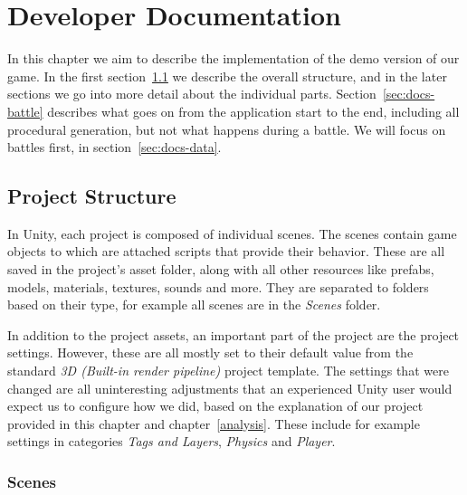 \chapter{Developer Documentation}

In this chapter we aim to describe the implementation of the demo version of our game.
In the first section~\ref{sec:docs-proj} we describe the overall structure, and in the later sections we go into more detail about the individual parts.
Section~\ref{sec:docs-battle} describes what goes on from the application start to the end, including all procedural generation, but not what happens during a battle.
We will focus on battles first, in section~\ref{sec:docs-data}.

\section{Project Structure}\label{sec:docs-proj}

In Unity, each project is composed of individual scenes.
The scenes contain game objects to which are attached scripts that provide their behavior.
These are all saved in the project's asset folder, along with all other resources like prefabs, models, materials, textures, sounds and more.
They are separated to folders based on their type, for example all scenes are in the \emph{Scenes} folder.

In addition to the project assets, an important part of the project are the project settings.
However, these are all mostly set to their default value from the standard \emph{3D (Built-in render pipeline)} project template.
The settings that were changed are all uninteresting adjustments that an experienced Unity user would expect us to configure how we did, based on the explanation of our project provided in this chapter and chapter~\ref{analysis}.
These include for example settings in categories \emph{Tags and Layers}, \emph{Physics} and \emph{Player}.

\subsection{Scenes}

